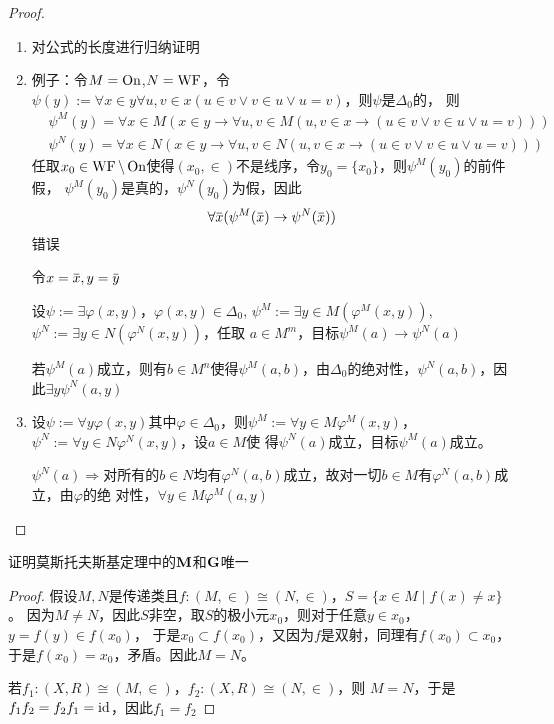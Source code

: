 \documentclass[11pt]{article}
\begin{document}
\begin{proof}
\begin{enumerate}
\item 对公式的长度进行归纳证明
\item 例子：令\(M=\operatorname{On}\),\(N=\operatorname{WF}\)，令\(\psi(y):=\forall x\in y\forall u,v\in x(u\in v\vee v\in u\vee u=v)\)，则\(\psi\)是\(\Delta_0\)的，
则
\begin{align*}
&\psi^M(y)=\forall x\in M(x\in y\to\forall u,v\in M(u,v\in x\to(u\in v\vee v\in u\vee u=v)))\\
&\psi^N(y)=\forall x\in N(x\in y\to\forall u,v\in N(u,v\in x\to(u\in v\vee v\in u\vee u=v)))
\end{align*}
任取\(x_0\in\operatorname{WF}\setminus\operatorname{On}\)使得\((x_0,\in)\)不是线序，令\(y_0=\{x_0\}\)，则\(\psi^M(y_0)\)的前件假，
\(\psi^M(y_0)\)是真的，\(\psi^N(y_0)\)为假，因此
\begin{equation*}
\forall\barx(\psi^M(\barx)\to\psi^N(\barx))
\end{equation*}
错误

令\(x=\barx,y=\bary\)

设\(\psi:=\exists\varphi(x,y)\)，\(\varphi(x,y)\in\Delta_0\), \(\psi^M:=\exists y\in M(\varphi^M(x,y))\), \(\psi^N:=\exists y\in N(\varphi^N(x,y))\)，任取
\(a\in M^m\)，目标\(\psi^M(a)\to\psi^N(a)\)

若\(\psi^M(a)\)成立，则有\(b\in M^n\)使得\(\psi^M(a,b)\)，由\(\Delta_0\)的绝对性，\(\psi^N(a,b)\)，因此\(\exists y\psi^N(a,y)\)
\item 设\(\psi:=\forall y\varphi(x,y)\)其中\(\varphi\in\Delta_0\)，则\(\psi^M:=\forall y\in M\varphi^M(x,y)\)，\(\psi^N:=\forall y\in N\varphi^N(x,y)\)，设\(a\in M\)使
得\(\psi^N(a)\)成立，目标\(\psi^M(a)\)成立。

\(\psi^N(a)\Rightarrow\)对所有的\(b\in N\)均有\(\varphi^N(a,b)\)成立，故对一切\(b\in M\)有\(\varphi^N(a,b)\)成立，由\(\varphi\)的绝
对性，\(\forall y\in M\varphi^M(a,y)\)
\end{enumerate}
\end{proof}

\begin{exercise}[7.10.7]
证明莫斯托夫斯基定理中的\(\operatorname{\textbf{M}}\)和\(\operatorname{\textbf{G}}\)唯一
\end{exercise}

\begin{proof}
假设\(M,N\)是传递类且\(f:(M,\in)\cong(N,\in)\)，\(S=\{x\in M\mid f(x)\neq x\}\)。
因为\(M\neq N\)，因此\(S\)非空，取\(S\)的极小元\(x_0\)，则对于任意\(y\in x_0\)，\(y=f(y)\in f(x_0)\)，
于是\(x_0\subset f(x_0)\)，又因为\(f\)是双射，同理有\(f(x_0)\subset x_0\)，于是\(f(x_0)=x_0\)，矛盾。因此\(M=N\)。

若\(f_1:(X,R)\cong(M,\in)\)，\(f_2:(X,R)\cong(N,\in)\)，则 \(M=N\)，于是\(f_1f_2=f_2f_1=\operatorname{id}\)，因此\(f_1=f_2\)
\end{proof}
\end{document}
